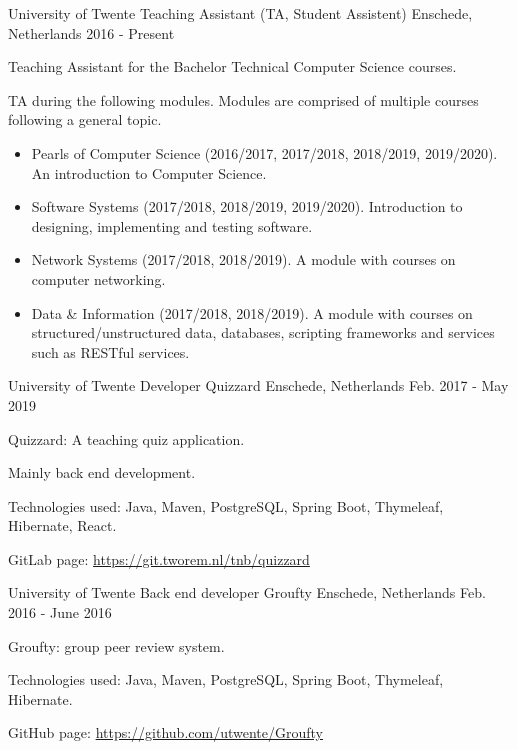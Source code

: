 
\begin{cventries}

\cventry
{University of Twente} %
{Teaching Assistant (TA, Student Assistent)} %
{Enschede, Netherlands} %
{2016 - Present} %
{ 
\begin{cvitems} %
     	\item Teaching Assistant for the Bachelor Technical Computer Science courses.
     	\item TA during the following modules. Modules are comprised of multiple courses following a general topic. 
     	\begin{itemize}
     		\item Pearls of Computer Science (2016/2017, 2017/2018, 2018/2019, 2019/2020). An introduction to Computer Science.
     		\item Software Systems (2017/2018, 2018/2019, 2019/2020). Introduction to designing, implementing and testing software.
     		\item Network Systems (2017/2018, 2018/2019). A module with courses on computer networking.
     		\item Data \& Information (2017/2018, 2018/2019). A module with courses on structured/unstructured data, databases, scripting frameworks and services such as RESTful services.
     	\end{itemize}
\end{cvitems}
}

\cventry
{University of Twente} %
{Developer Quizzard} %
{Enschede, Netherlands} %
{Feb. 2017 - May 2019} %
{
	\begin{cvitems}
		\item Quizzard: A teaching quiz application.
		\item Mainly back end development. 
		\item Technologies used: Java, Maven, PostgreSQL, Spring Boot, Thymeleaf, Hibernate, React.
		\item GitLab page: \url{https://git.tworem.nl/tnb/quizzard}
	\end{cvitems}
}

\cventry
{University of Twente} %
{Back end developer Groufty} %
{Enschede, Netherlands} %
{Feb. 2016 - June 2016} %
{
  \begin{cvitems}
	\item Groufty: group peer review system.
	\item Technologies used: Java, Maven, PostgreSQL, Spring Boot, Thymeleaf, Hibernate.
	\item GitHub page: \url{https://github.com/utwente/Groufty}
  \end{cvitems}
}


\end{cventries}
